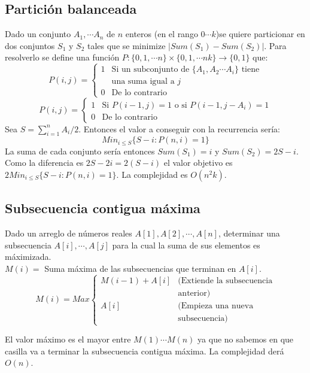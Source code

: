 \begin{multicols}{2}
\subsection{Partici\'on balanceada}
Dado un conjunto $A_1,\cdots A_n$ de $n$ enteros (en el rango $0\cdots k$)se quiere particionar en dos conjuntos $S_1$ y $S_2$ tales que se minimize $|Sum(S_1)-Sum(S_2)|$. Para resolverlo se define una funci\'on $ P : \{0,1,\cdots n\}\times \{0,1,\cdots nk\} \rightarrow \{0,1\} $ que:
\[
	P(i,j)= \left\{ \begin{array}{ll} 
		1 & \mbox{Si un subconjunto de $\{A_1,A_2 \cdots A_i\}$ tiene}\\ & \mbox{una suma igual a $j$ }\\ 
		0 & \mbox{De lo contrario} \end{array} \right.
\]
\[
	P(i,j)= \left\{ \begin{array}{ll}
		1 &  \mbox{Si $P(i-1,j)=1$ o si $P(i-1,j-A_i)=1$}\\ 
		0 & \mbox{De lo contrario} \end{array} \right.
\]
Sea $S=\sum_{i=1}^nA_i/2$. Entonces el valor a conseguir con la recurrencia ser\'ia:
\[
	Min_{i\leq S}\{S-i:P(n,i)=1\}
\]
La suma de cada conjunto ser\'ia entonces $Sum(S_1)=i$ y $Sum(S_2)=2S-i$. Como la diferencia es $2S-2i=2(S-i)$ el valor objetivo es $2Min_{i\leq S}\{S-i:P(n,i)=1\}$. La complejidad es $O(n^2k)$.
\subsection{Subsecuencia contigua m\'axima}
Dado un arreglo de n\'umeros reales $A[1],A[2],\cdots,A[n]$, determinar una subsecuencia $A[i],\cdots,A[j]$ para la cual la suma de sus elementos es m\'aximizada.\\

$M(i) =$ Suma m\'axima de las subsecuencias que terminan en $A[i]$.\\
\[
	M(i) = Max\left\{ \begin{array}{ll}
		M(i-1) + A[i] & ( \mbox{Extiende la subsecuencia}\\ & \mbox{anterior})\\ 
		A[i] & (\mbox{Empieza una nueva}\\ & \mbox{subsecuencia}) \end{array} \right.
\]

El valor m\'aximo es el mayor entre $M(1)\cdots M(n)$ ya que no sabemos en que casilla va a terminar la subsecuencia contigua m\'axima. La complejidad der\'a $O(n)$.


\end{multicols}
